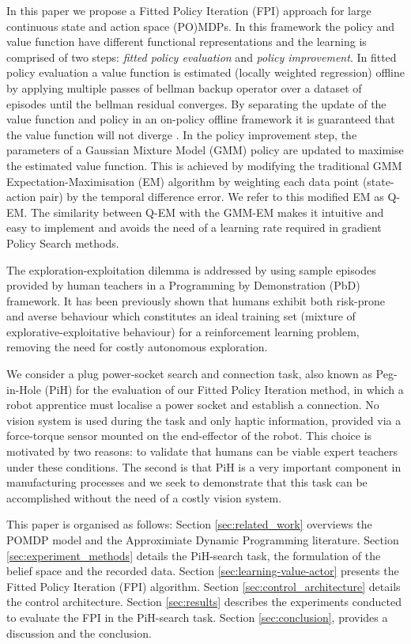 \documentclass[final,5p,times,twocolumn]{elsarticle}
\begin{document}
In this paper we propose a Fitted Policy Iteration (FPI) approach for large continuous state and action space 
(PO)MDPs. In this framework the policy and value function have different functional representations and the learning 
is comprised of two steps: \textit{fitted policy evaluation} and \textit{policy improvement}. In fitted policy 
evaluation a value function is estimated (locally weighted regression) offline by applying multiple passes of 
bellman backup operator over a dataset of episodes until the bellman residual converges. 
By separating the update of the value function and policy in an on-policy offline framework 
it is guaranteed that the value function will not diverge \cite{stable_FA_gordon_1995,LSPI_2003}. 
In the policy improvement step, the parameters of a Gaussian Mixture Model (GMM) policy are updated 
to maximise the estimated value function. This is achieved by modifying the traditional GMM 
Expectation-Maximisation (EM) \cite{Bilmes97agentle} algorithm 
by weighting each data point (state-action pair) by the temporal difference error. We refer to this modified EM as Q-EM. 
The similarity between Q-EM with the GMM-EM makes it intuitive and easy to implement and avoids the need of a learning rate 
required in gradient Policy Search methods.

The exploration-exploitation dilemma is addressed by using sample episodes provided by human 
teachers in a Programming by Demonstration (PbD) framework. It has been previously shown \cite{Chambrier2014} 
that humans exhibit both risk-prone and averse behaviour which constitutes an ideal training set 
(mixture of explorative-exploitative behaviour) for a reinforcement learning problem, removing the 
need for costly autonomous exploration. 

We consider a plug power-socket search and connection task, also known as Peg-in-Hole 
(PiH)\cite{search_strategies_icra_2001} for the evaluation of our Fitted Policy Iteration method, 
in which a robot apprentice must localise a power socket and establish a connection. 
No vision system is used during the task and only haptic information, provided via 
a force-torque sensor mounted on the end-effector of the robot. This choice is motivated by two reasons:
to validate that humans can be viable expert teachers under these conditions. The second is that PiH is a very important component 
in manufacturing processes and we seek to demonstrate that this task can be accomplished without the need of
a costly vision system. 

This paper is organised as follows: Section \ref{sec:related_work} overviews the POMDP model and the Approximiate Dynamic Programming 
literature. Section \ref{sec:experiment_methods} details the PiH-search task, the formulation of the belief space and the recorded data. Section \ref{sec:learning-value-actor} presents the Fitted Policy Iteration (FPI) algorithm.
Section \ref{sec:control_architecture} details the control architecture. Section \ref{sec:results} describes the experiments 
conducted to evaluate the FPI in the PiH-search task. Section \ref{sec:conclusion}, provides a discussion and the conclusion.
\end{document}

